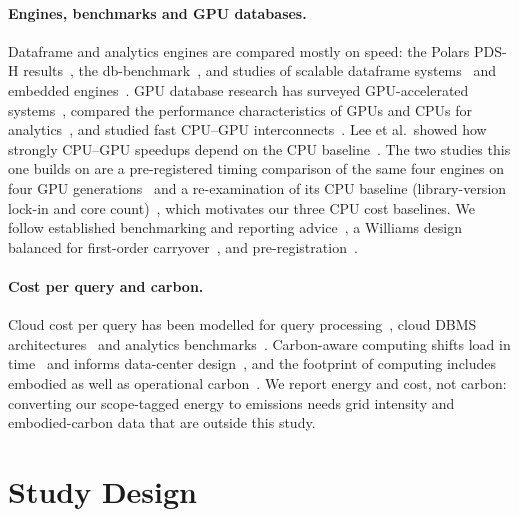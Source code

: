 \documentclass[sigconf]{acmart}
\begin{document}
\paragraph{Engines, benchmarks and GPU databases.}
Dataframe and analytics engines are compared mostly on speed: the Polars PDS-H
results~\cite{vink2025pdsh}, the db-benchmark~\cite{dbbenchmark}, and studies of scalable
dataframe systems~\cite{petersohn2020dataframes} and embedded engines~\cite{raasveldt2019duckdb}.
GPU database research has surveyed GPU-accelerated systems~\cite{bress2014gpudb,rosenfeld2022heterogeneous},
compared the performance characteristics of GPUs and CPUs for analytics~\cite{shanbhag2020gpucpu},
and studied fast CPU--GPU interconnects~\cite{lutz2020pump}. Lee et al.\ showed how strongly
CPU--GPU speedups depend on the CPU baseline~\cite{lee2010debunking}. The two studies this one
builds on are a pre-registered timing comparison of the same four engines on four GPU
generations~\cite{ejiofor2026p1} and a re-examination of its CPU baseline (library-version
lock-in and core count)~\cite{ejiofor2026p2}, which motivates our three CPU cost baselines. We
follow established benchmarking and reporting
advice~\cite{hoefler2015scientific,raasveldt2018fair,fleming1986geomean}, a Williams design
balanced for first-order carryover~\cite{williams1949latin}, and
pre-registration~\cite{nosek2018prereg}.

\paragraph{Cost per query and carbon.}
Cloud cost per query has been modelled for query processing~\cite{leis2021costoptimal}, cloud
DBMS architectures~\cite{tan2019cloud} and analytics benchmarks~\cite{vanrenen2023cab}.
Carbon-aware computing shifts load in time~\cite{wiesner2021wait,radovanovic2023carbon,lechowicz2025carbon} and
informs data-center design~\cite{acun2023carbonexplorer}, and the footprint of computing
includes embodied as well as operational carbon~\cite{gupta2021chasing}. We report
energy and cost, not carbon: converting our scope-tagged energy to emissions needs grid
intensity and embodied-carbon data that are outside this study.

\section{Study Design}
\label{sec:design}
\end{document}
